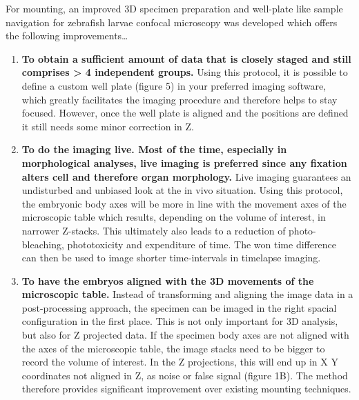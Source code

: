 \documentclass[11pt,singlespacinge,twoside]{reedthesis} %
\def\labelenumi{\arabic{enumi}.}
\begin{document}
For mounting, an improved 3D specimen preparation and well-plate like sample navigation for zebrafish larvae confocal microscopy was developed which offers the following improvements\ldots{}
\begin{enumerate}
\def\labelenumi{\arabic{enumi}.}
\item
  \textbf{To obtain a sufficient amount of data that is closely staged and still comprises \textgreater{} 4 independent groups.} Using this protocol, it is possible to define a custom well plate (figure 5) in your preferred imaging software, which greatly facilitates the imaging procedure and therefore helps to stay focused. However, once the well plate is aligned and the positions are defined it still needs some minor correction in Z.
\item
  \textbf{To do the imaging live. Most of the time, especially in morphological analyses, live imaging is preferred since any fixation alters cell and therefore organ morphology.} Live imaging guarantees an undisturbed and unbiased look at the in vivo situation. Using this protocol, the embryonic body axes will be more in line with the movement axes of the microscopic table which results, depending on the volume of interest, in narrower Z-stacks. This ultimately also leads to a reduction of photo-bleaching, phototoxicity and expenditure of time. The won time difference can then be used to image shorter time-intervals in timelapse imaging.
\item
  \textbf{To have the embryos aligned with the 3D movements of the microscopic table.} Instead of transforming and aligning the image data in a post-processing approach, the specimen can be imaged in the right spacial configuration in the first place. This is not only important for 3D analysis, but also for Z projected data. If the specimen body axes are not aligned with the axes of the microscopic table, the image stacks need to be bigger to record the volume of interest. In the Z projections, this will end up in X Y coordinates not aligned in Z, as noise or false signal (figure 1B). The method therefore provides significant improvement over existing mounting techniques.
\end{enumerate}
\end{document}
